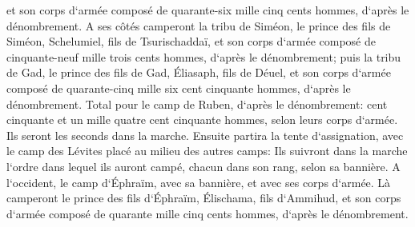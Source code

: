 \verse et son corps d`armée composé de quarante-six mille cinq cents hommes, d`après le dénombrement. 
\verse A ses côtés camperont la tribu de Siméon, le prince des fils de Siméon, Schelumiel, fils de Tsurischaddaï, 
\verse et son corps d`armée composé de cinquante-neuf mille trois cents hommes, d`après le dénombrement; 
\verse puis la tribu de Gad, le prince des fils de Gad, Éliasaph, fils de Déuel, 
\verse et son corps d`armée composé de quarante-cinq mille six cent cinquante hommes, d`après le dénombrement. 
\verse Total pour le camp de Ruben, d`après le dénombrement: cent cinquante et un mille quatre cent cinquante hommes, selon leurs corps d`armée. Ils seront les seconds dans la marche. 
\verse Ensuite partira la tente d`assignation, avec le camp des Lévites placé au milieu des autres camps: Ils suivront dans la marche l`ordre dans lequel ils auront campé, chacun dans son rang, selon sa bannière. 
\verse A l`occident, le camp d`Éphraïm, avec sa bannière, et avec ses corps d`armée. Là camperont le prince des fils d`Éphraïm, Élischama, fils d`Ammihud, 
\verse et son corps d`armée composé de quarante mille cinq cents hommes, d`après le dénombrement. 
